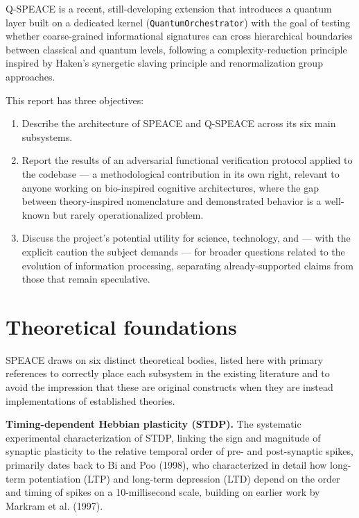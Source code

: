 \documentclass[11pt,a4paper]{article}
\newcommand{\code}[1]{\texttt{#1}}
\begin{document}
Q-SPEACE is a recent, still-developing extension that introduces a quantum layer built on a dedicated kernel (\code{QuantumOrchestrator}) with the goal of testing whether coarse-grained informational signatures can cross hierarchical boundaries between classical and quantum levels, following a complexity-reduction principle inspired by Haken's synergetic slaving principle and renormalization group approaches.

This report has three objectives:

\begin{enumerate}
  \item Describe the architecture of SPEACE and Q-SPEACE across its six main subsystems.
  \item Report the results of an adversarial functional verification protocol applied to the codebase --- a methodological contribution in its own right, relevant to anyone working on bio-inspired cognitive architectures, where the gap between theory-inspired nomenclature and demonstrated behavior is a well-known but rarely operationalized problem.
  \item Discuss the project's potential utility for science, technology, and --- with the explicit caution the subject demands --- for broader questions related to the evolution of information processing, separating already-supported claims from those that remain speculative.
\end{enumerate}

\section{Theoretical foundations}
\label{sec:theory}

SPEACE draws on six distinct theoretical bodies, listed here with primary references to correctly place each subsystem in the existing literature and to avoid the impression that these are original constructs when they are instead implementations of established theories.

\textbf{Timing-dependent Hebbian plasticity (STDP).} The systematic experimental characterization of STDP, linking the sign and magnitude of synaptic plasticity to the relative temporal order of pre- and post-synaptic spikes, primarily dates back to Bi and Poo (1998), who characterized in detail how long-term potentiation (LTP) and long-term depression (LTD) depend on the order and timing of spikes on a 10-millisecond scale, building on earlier work by Markram et al. (1997).
\end{document}
